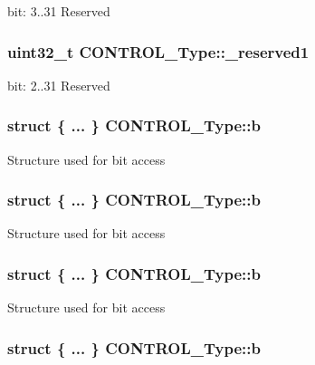 bit\-: 3..31 Reserved \hypertarget{union_c_o_n_t_r_o_l___type_aa7a5662079a447f801034d108f80ce49}{
\subsubsection[{\-\_\-reserved1}]{\setlength{\rightskip}{0pt plus 5cm}uint32\-\_\-t C\-O\-N\-T\-R\-O\-L\-\_\-\-Type\-::\-\_\-reserved1}}\label{union_c_o_n_t_r_o_l___type_aa7a5662079a447f801034d108f80ce49}
bit\-: 2..31 Reserved \hypertarget{union_c_o_n_t_r_o_l___type_adc6a38ab2980d0e9577b5a871da14eb9}{
\subsubsection[{b}]{\setlength{\rightskip}{0pt plus 5cm}struct \{ ... \}   C\-O\-N\-T\-R\-O\-L\-\_\-\-Type\-::b}}\label{union_c_o_n_t_r_o_l___type_adc6a38ab2980d0e9577b5a871da14eb9}
Structure used for bit access \hypertarget{union_c_o_n_t_r_o_l___type_a1da8f5ea1357734dd2b206723e3ed023}{
\subsubsection[{b}]{\setlength{\rightskip}{0pt plus 5cm}struct \{ ... \}   C\-O\-N\-T\-R\-O\-L\-\_\-\-Type\-::b}}\label{union_c_o_n_t_r_o_l___type_a1da8f5ea1357734dd2b206723e3ed023}
Structure used for bit access \hypertarget{union_c_o_n_t_r_o_l___type_ae3b4861e899b1f68818b60033a3914d9}{
\subsubsection[{b}]{\setlength{\rightskip}{0pt plus 5cm}struct \{ ... \}   C\-O\-N\-T\-R\-O\-L\-\_\-\-Type\-::b}}\label{union_c_o_n_t_r_o_l___type_ae3b4861e899b1f68818b60033a3914d9}
Structure used for bit access \hypertarget{union_c_o_n_t_r_o_l___type_afa110d4f7b263a9b5c34fb737ccb7fed}{
\subsubsection[{b}]{\setlength{\rightskip}{0pt plus 5cm}struct \{ ... \}   C\-O\-N\-T\-R\-O\-L\-\_\-\-Type\-::b}}\label{union_c_o_n_t_r_o_l___type_afa110d4f7b263a9b5c34fb737ccb7fed}
